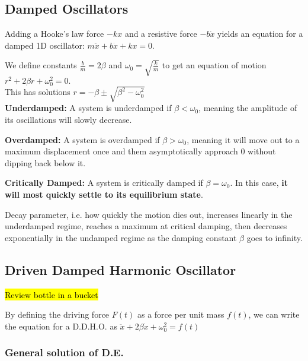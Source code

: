 \documentclass[a4paper, 11pt]{article}
\begin{document}
  \subsection{Damped Oscillators}
  Adding a Hooke's law force $-kx$ and a resistive force $-b\dot{x}$ yields an
  equation for a damped 1D oscillator: $m\ddot{x} + b\dot{x} + kx = 0$.

  We define constants $\frac{b}{m} = 2 \beta$ and $\omega_0 = \sqrt{\frac{k}{m}}$
  to get an equation of motion $r^2 + 2 \beta r + \omega_0^2 = 0.$  \\
  This has solutions $r = -\beta \pm \sqrt{\beta^2 - \omega_0^2}$ \\

  \textbf{Underdamped: } A system is underdamped if $\beta < \omega_0$, meaning
  the amplitude of its oscillations will slowly decrease.

  \textbf{Overdamped: } A system is overdamped if $\beta > \omega_0$, meaning it
  will move out to a maximum displacement once and them asymptotically approach 0 without
  dipping back below it.

  \textbf{Critically Damped: } A system is critically damped if $\beta = \omega_0$.
  In this case, \textbf{it will most quickly settle to its equilibrium state}.

  Decay parameter, i.e. how quickly the motion dies out, increases linearly in the
  underdamped regime, reaches a maximum at critical damping, then decreases
  exponentially in the undamped regime as the damping constant $\beta$ goes to infinity.



  \subsection{Driven Damped Harmonic Oscillator}
  \hl{Review bottle in a bucket}

  By defining the driving force $F(t)$ as a force per unit mass $f(t)$, we can
  write the equation for a D.D.H.O. as $\ddot{x} + 2 \beta \dot{x} + \omega_0^2 = f(t)$



  \subsubsection{General solution of D.E.}
\end{document}

